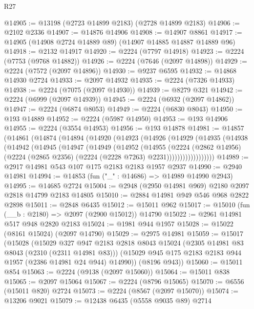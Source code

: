 \begin{lexlean}{R27}
\begin{coremodule}
@14905 := @13198 (@2723 @14899 @2183) (@2728 @14899 @2183)
@14906 := @2102 @2336
@14907 := @14876 @14906
@14908 := @14907 @8861
@14917 := @14905 (@14908 @2724 @14889 @89) (@14907 @14885 @14887 @14889 @96)
@14918 := @2132 @14917
@14920 := @2224 (@7797 @14918)
@14923 := @2224 (@7753 (@9768 @14882))
@14926 := @2224 (@7646 (@2097 @14898))
@14929 := @2224 (@7572 (@2097 @14896))
@14930 := @9237 @6595
@14932 := @14868 @14930 @2724
@14933 := @2097 @14932
@14935 := @2224 (@7326 @14933)
@14938 := @2224 (@7075 (@2097 @14930))
@14939 := @8279 @321
@14942 := @2224 (@6999 (@2097 @14939))
@14945 := @2224 (@6932 (@2097 @14862))
@14947 := @2224 (@6874 @8053)
@14949 := @2224 (@6830 @8043)
@14950 := @193 @14889
@14952 := @2224 (@5987 @14950)
@14953 := @193 @14906
@14955 := @2224 (@3554 @14953)
@14956 := @193 @14878
@14981 := @14857
    (@14861
      (@14874
        (@14894
          (@14920
            (@14923
              (@14926
                (@14929
                  (@14935
                    (@14938
                      (@14942
                        (@14945
                          (@14947
                            (@14949
                              (@14952
                                (@14955
                                  (@2224
                                    (@2862 @14956)
                                    (@2224
                                      (@2865 @2356)
                                      (@2224 (@2228 @7263) @2231))))))))))))))))))
@14989 := @2917 @14981 @543 @107 @175 @2183 @2183 @1957 @2937
@14990 := @2940 @14981
@14994 := @14853 (fun ("_" : @14686) => @14989 @14990 @2943)
@14995 := @14685 @2724
@15004 := @2948 (@2950 @14981 @969) @2180 @2097 @2818 @14799 @2183 @14805
@15010 := @2884 @14981 @949 @546 @968 @2822 @2898
@15011 := @2848 @6435
@15012 := @15011 @962
@15017 := @15010 (fun (__b : @2180) => @2097 (@2900 @15012)) @14790
@15022 := @2961 @14981 @517 @948 @2820 @2183
@15024 := @1981 @944 @1957
@15028 := @15022 (@8161 @15024) (@2097 @14790)
@15029 := @2975 @14981
@15059 := @15017
    (@15028
      (@15029
        @327
        @947
        @2183
        @2818
        @8043
        @15024
        (@2305 @14981 @83 @8043 (@2310 (@2311 @14981 @83)))
        (@15029 @945 @175 @2183 @2183 @944 @1957 (@2386 @14981 @24 @944) @14990))
      (@8196 @943))
@15060 := @15011 @854
@15063 := @2224 (@9138 (@2097 @15060))
@15064 := @15011 @838
@15065 := @2097 @15064
@15067 := @2224 (@8796 @15065)
@15070 := @6556 (@15011 @820) @2724
@15073 := @2224 (@8567 (@2097 @15070))
@15074 := @13206 @9021
@15079 := @12438 @6435 (@5558 @9035 @89) @2714

\end{coremodule}
\end{lexlean}
